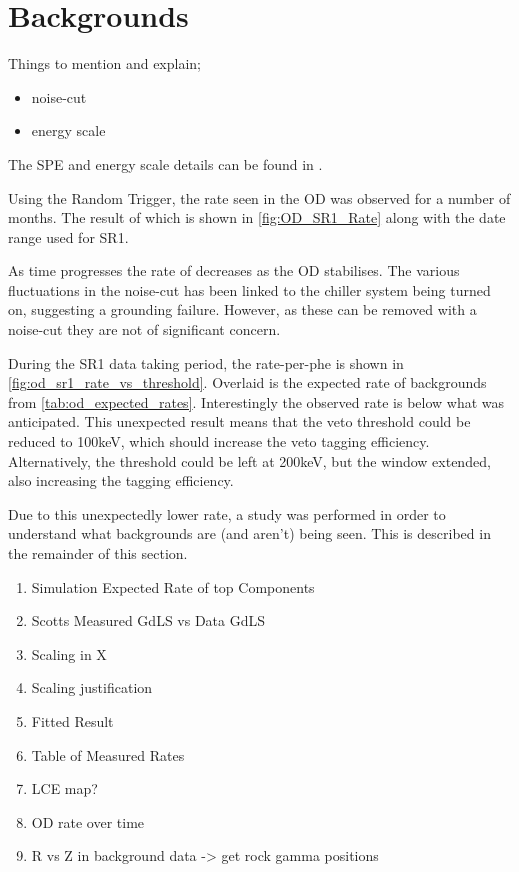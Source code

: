 \section{Backgrounds}
Things to mention and explain;
\begin{itemize}
    \item noise-cut
    \item energy scale
\end{itemize}

The SPE and energy scale details can be found in \cite{ewanfraser_thesis_ref}.

\par
Using the Random Trigger, the rate seen in the OD was observed for a number of months.
The result of which is shown in \autoref{fig:OD_SR1_Rate} along with the date range used for SR1.

\par
As time progresses the rate of decreases as the OD stabilises.
The various fluctuations in the noise-cut has been linked to the chiller system being turned on, suggesting a grounding failure.
However, as these can be removed with a noise-cut they are not of significant concern.


\par
During the SR1 data taking period, the rate-per-phe is shown in \autoref{fig:od_sr1_rate_vs_threshold}.
Overlaid is the expected rate of backgrounds from \autoref{tab:od_expected_rates}.
Interestingly the observed rate is below what was anticipated.
This unexpected result means that the veto threshold could be reduced to 100keV, which should increase the veto tagging efficiency.
Alternatively, the threshold could be left at 200keV, but the window extended, also increasing the tagging efficiency.



\par
Due to this unexpectedly lower rate, a study was performed in order to understand what backgrounds are (and aren't) being seen.
This is described in the remainder of this section.


\begin{tcolorbox}[colback=red!5!white, colframe=red!50!black, title=Key Plots]
\begin{enumerate}
    \item Simulation Expected Rate of top Components
    \item Scotts Measured GdLS vs Data GdLS
    \item Scaling in X
    \item Scaling justification
    \item Fitted Result
    \item Table of Measured Rates
    \item LCE map?
    \item OD rate over time
    \item R vs Z in background data -> get rock gamma positions    
\end{enumerate}
\end{tcolorbox}


